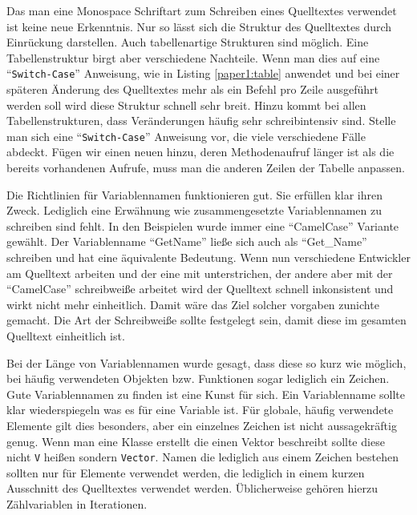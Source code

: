 Das man eine Monospace Schriftart zum Schreiben eines Quelltextes verwendet ist keine neue Erkenntnis. Nur so lässt sich die Struktur des Quelltextes durch Einrückung darstellen. Auch tabellenartige Strukturen sind möglich. Eine Tabellenstruktur birgt aber verschiedene Nachteile. Wenn man dies auf eine \enquote{\texttt{Switch-Case}} Anweisung, wie in Listing \ref{paper1:table} anwendet und bei einer späteren Änderung des Quelltextes mehr als ein Befehl pro Zeile ausgeführt werden soll wird diese Struktur schnell sehr breit. Hinzu kommt bei allen Tabellenstrukturen, dass  Veränderungen häufig sehr schreibintensiv sind. Stelle man sich eine \enquote{\texttt{Switch-Case}} Anweisung vor, die viele verschiedene Fälle abdeckt. Fügen wir einen neuen hinzu, deren Methodenaufruf länger ist als die bereits vorhandenen Aufrufe, muss man die anderen Zeilen der Tabelle anpassen.

Die Richtlinien für Variablennamen funktionieren gut. Sie erfüllen klar ihren Zweck. Lediglich eine Erwähnung wie zusammengesetzte Variablennamen zu schreiben sind fehlt. In den Beispielen wurde immer eine \enquote{CamelCase} Variante gewählt. Der Variablenname \enquote{GetName} ließe sich auch als \enquote{Get\_Name} schreiben und hat eine äquivalente Bedeutung. Wenn nun verschiedene Entwickler am Quelltext arbeiten und der eine mit unterstrichen, der andere aber mit der \enquote{CamelCase} schreibweiße arbeitet wird der Quelltext schnell inkonsistent und wirkt nicht mehr einheitlich. Damit wäre das Ziel solcher vorgaben zunichte gemacht. Die Art der Schreibweiße sollte festgelegt sein, damit diese im gesamten Quelltext einheitlich ist.

Bei der Länge von Variablennamen wurde gesagt, dass diese so kurz wie möglich, bei häufig verwendeten Objekten bzw. Funktionen sogar lediglich ein Zeichen. Gute Variablennamen zu finden ist eine Kunst für sich. Ein Variablenname sollte klar wiederspiegeln was es für eine Variable ist. Für globale, häufig verwendete Elemente gilt dies besonders, aber ein einzelnes Zeichen ist nicht aussagekräftig genug. Wenn man eine Klasse erstellt die einen Vektor beschreibt sollte diese nicht \texttt{V} heißen sondern \texttt{Vector}. Namen die lediglich aus einem Zeichen bestehen sollten nur für Elemente verwendet werden, die lediglich in einem kurzen Ausschnitt des Quelltextes verwendet werden. Üblicherweise gehören hierzu Zählvariablen in Iterationen.

